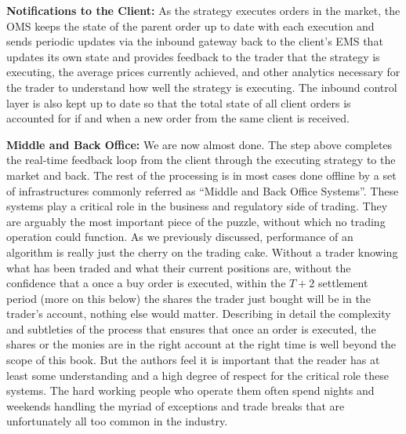 \noindent\textbf{Notifications to the Client:} As the strategy executes orders in the market, the OMS keeps the state of the parent order up to date with each execution and sends periodic updates via the inbound gateway back to the client's EMS that updates its own state and provides feedback to the trader that the strategy is executing, the average prices currently achieved, and other analytics necessary for the trader to understand how well the strategy is executing. The inbound control layer is also kept up to date so that the total state of all client orders is accounted for if and when a new order from the same client is received. \twomedskip


\noindent\textbf{Middle and Back Office:} We are now almost done. The step above completes the real-time feedback loop from the client through the executing strategy to the market and back. The rest of the processing is in most cases done offline by a set of infrastructures commonly referred as ``Middle and Back Office Systems''. These systems play a critical role in the business and regulatory side of trading. They are arguably the most important piece of the puzzle, without which no trading operation could function. As we previously discussed, performance of an algorithm is really just the cherry on the trading cake. Without a trader knowing what has been traded and what their current positions are, without the confidence that a once a buy order is executed, within the $T+2$ settlement period (more on this below) the shares the trader just bought will be in the trader's account, nothing else would matter. Describing in detail the complexity and subtleties of the process that ensures that once an order is executed, the shares or the monies are in the right account at the right time is well beyond the scope of this book. But the authors feel it is important that the reader has at least some understanding and a high degree of respect for the critical role these systems. The hard working people who operate them often spend nights and weekends handling the myriad of exceptions and trade breaks that are unfortunately all too common in the industry.


